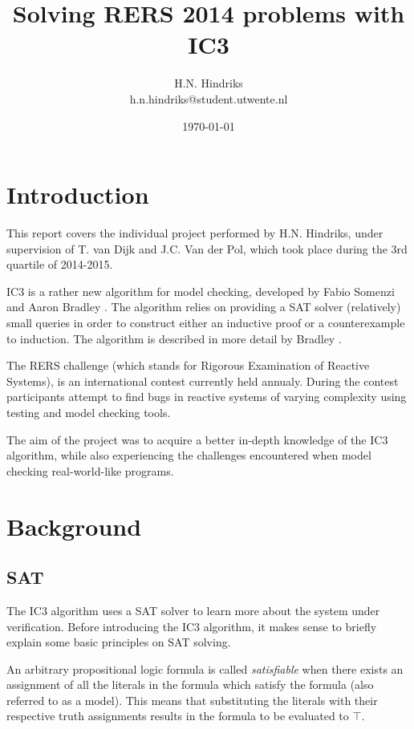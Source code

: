 \documentclass[a4paper]{article}
\begin{document}
\title{Solving RERS 2014 problems with IC3}
\author{H.N. Hindriks\\h.n.hindriks@student.utwente.nl}
\date{\today}
\maketitle

\section{Introduction}
This report covers the individual project performed by H.N. Hindriks, under supervision of T. van Dijk and J.C. Van der Pol, which took place during the 3rd quartile of 2014-2015.

IC3 is a rather new algorithm for model checking, developed by Fabio Somenzi and Aaron Bradley \cite{Bradley2007}. The algorithm relies on providing a SAT solver (relatively) small queries in order to construct either an inductive proof or a counterexample to induction. The algorithm is described in more detail by Bradley \cite{Bradley2011}.

The RERS challenge (which stands for Rigorous Examination of Reactive Systems), is an international contest currently held annualy. During the contest participants attempt to find bugs in reactive systems of varying complexity using testing and model checking tools.

The aim of the project was to acquire a better in-depth knowledge of the IC3 algorithm, while also experiencing the challenges encountered when model checking real-world-like programs.

\newpage
\tableofcontents

\newpage
\section{Background}
\subsection{SAT}
The IC3 algorithm uses a SAT solver to learn more about the system under verification. Before introducing the IC3 algorithm, it makes sense to briefly explain some basic principles on SAT solving.

An arbitrary propositional logic formula is called \emph{satisfiable} when there exists an assignment of all the literals in the formula which satisfy the formula (also referred to as a model). This means that substituting the literals with their respective truth assignments results in the formula to be evaluated to $\top$.
\end{document}
